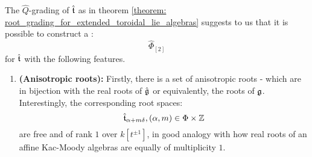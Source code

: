         \begin{remark} \label{remark: toroidal_root_systems}
            The $\hat{Q}$-grading of $\hat{\mathfrak{t}}$ as in theorem \ref{theorem: root_grading_for_extended_toroidal_lie_algebras} suggests to us that it is possible to construct a :
                $$\hat{\Phi}_{[2]}$$
            for $\hat{\mathfrak{t}}$ with the following features.
            \begin{enumerate}
                \item \textbf{(Anisotropic roots):} Firstly, there is a set of anisotropic roots - which are in bijection with the real roots of $\hat{\mathfrak{g}}$ or equivalently, the roots of $\mathfrak{g}$. Interestingly, the corresponding root spaces:
                    $$\extendedtoroidal_{\alpha + m\delta}, (\alpha, m) \in \Phi \x \Z$$
                are free and of rank $1$ over $k[t^{\pm 1}]$, in good analogy with how real roots of an affine Kac-Moody algebras are equally of multiplicity $1$.


\end{enumerate}
\end{remark}
